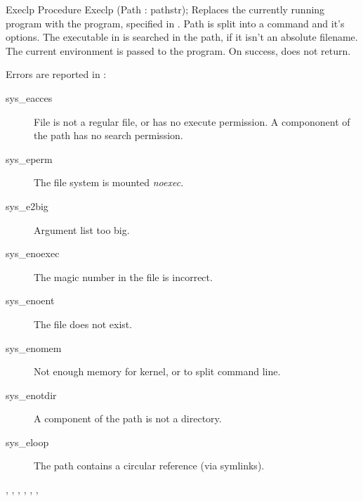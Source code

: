 \begin{procedure}{Execlp}
\Declaration
Procedure Execlp (Path : pathstr);
\Description
Replaces the currently running program with the program, specified in
. Path is split into a command and it's options.
The executable in  is searched in the path, if it isn't
an absolute filename.
The current environment is passed to the program.
On success,  does not return.

\Errors
Errors are reported in :
\begin{description}
\item[sys\_eacces] File is not a regular file, or has no execute permission.
A compononent of the path has no search permission.
\item[sys\_eperm] The file system is mounted \textit{noexec}.
\item[sys\_e2big] Argument list too big.
\item[sys\_enoexec] The magic number in the file is incorrect.
\item[sys\_enoent] The file does not exist.
\item[sys\_enomem] Not enough memory for kernel, or to split command line.
\item[sys\_enotdir] A component of the path is not a directory.
\item[sys\_eloop] The path contains a circular reference (via symlinks).
\end{description}
\SeeAlso
{}, , , ,
, ,  
\end{procedure}


